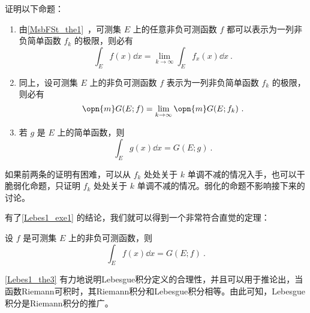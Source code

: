 \begin{exercise}{}\label{Lebes1_exe1}
证明以下命题：

\begin{enumerate}
\item 由\autoref{MsbFSt_the1}~，可测集 $E$ 上的任意非负可测函数 $f$ 都可以表示为一列非负简单函数 $f_k$ 的极限，则必有
\begin{equation}
\int_E f(x) \dd x = \lim\limits_{k\to\infty} \int_{E} f_x(x) \dd x~.
\end{equation}
\item 同上，设可测集 $E$ 上的非负可测函数 $f$ 表示为一列非负简单函数 $f_k$ 的极限，则必有
\begin{equation}
\opn{m}G(E; f)=\lim\limits_{k\to \infty} \opn{m}G(E; f_k)~.
\end{equation}
\item 若 $g$ 是 $E$ 上的简单函数，则
\begin{equation}
\int_E g(x) \dd x = G(E; g)~.
\end{equation}
\end{enumerate}

如果前两条的证明有困难，可以从 $f_k$ 处处关于 $k$ 单调不减的情况入手，也可以干脆弱化命题，只证明 $f_k$ 处处关于 $k$ 单调不减的情况。弱化的命题不影响接下来的讨论。
\end{exercise}

有了\autoref{Lebes1_exe1} 的结论，我们就可以得到一个非常符合直觉的定理：

\begin{theorem}{}\label{Lebes1_the3}
设 $f$ 是可测集 $E$ 上的非负可测函数，则
\begin{equation}
\int_E f(x) \dd x = G(E; f)~.
\end{equation}
\end{theorem}

\autoref{Lebes1_the3} 有力地说明Lebesgue积分定义的合理性，并且可以用于推论出，当函数Riemann可积时，其Riemann积分和Lebesgue积分相等。由此可知，Lebesgue积分是Riemann积分的推广。













